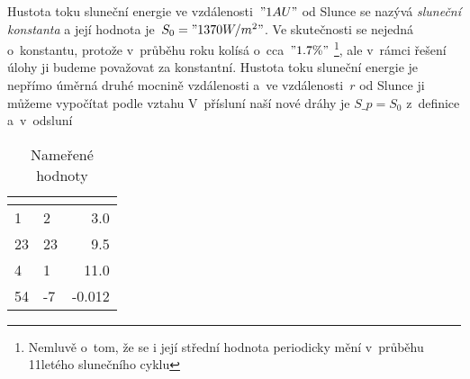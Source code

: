 \documentclass[twoside,fykos]{fksserie}
\begin{document}

Hustota toku sluneční energie ve vzdálenosti~$"1 AU"$ od Slunce se
nazývá {\it sluneční konstanta} a její hodnota je~$S_0 = "1370 W/m^2"$. Ve 
skutečnosti se nejedná o~konstantu, protože v~průběhu roku kolísá
o~cca~$"1.7 \%"$%
\footnote{Nemluvě o~tom, že se i její střední hodnota 
periodicky mění v~průběhu 11letého slunečního cyklu},
ale v~rámci řešení úlohy
ji budeme považovat za konstantní. Hustota toku sluneční energie je 
nepřímo úměrná druhé mocnině vzdálenosti a~ve vzdálenosti~$r$ od 
Slunce ji můžeme vypočítat podle vztahu
V~přísluní naší nové dráhy je $S\_p = S_0$ z~definice a~v~odsluní

\begin{table}
\centering
\begin{tabular}{llD{.}{,}{-1}}
\toprule
{} &  & \\
 & 2 & 3.0\\
23 & 23 & 9.5\\
4 & 1 & 11.0\\
54 & -7 & -0.012\\
\bottomrule
\end{tabular}
\caption{Nameřené hodnoty}
\end{table}
\end{document}
